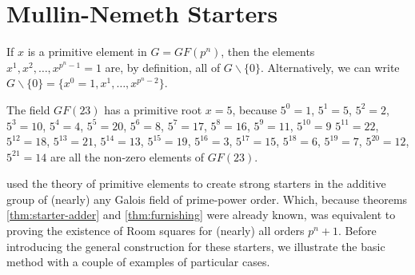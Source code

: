 \section{Mullin-Nemeth Starters}

If $x$ is a primitive element in $G = GF(p^n)$, then the elements
$x^1, x^2, \ldots, x^{p^n - 1} = 1$ are, by definition, all of $G \backslash \{0\}$.
Alternatively, we can write $G \backslash \{0\} = \{x^0 = 1, x^1, \ldots, x^{p^n - 2}\}$.

\begin{example}
The field $GF(23)$ has a primitive root $x = 5$, because
$5^0 = 1$, $5^1 = 5$, $5^2 = 2$, $5^3 = 10$, $5^4 = 4$,
$5^5 = 20$, $5^6 = 8$, $5^7 = 17$, $5^8 = 16$, $5^9 = 11$,
$5^{10} = 9$ $5^{11} = 22$, $5^{12} = 18$, $5^{13} = 21$,
$5^{14}  =13$, $5^{15} = 19$, $5^{16} = 3$, $5^{17} = 15$,
$5^{18} = 6$, $5^{19} = 7$, $5^{20} = 12$, $5^{21} = 14$
are all the non-zero elements of $GF(23)$.
\end{example}

\cite{mullinFurnishingRoomSquares1969}
used the theory of primitive elements to create strong starters in the additive group of (nearly) any Galois field of prime-power order.
Which, because theorems
\ref{thm:starter-adder}
and
\ref{thm:furnishing}
were already known, was equivalent to proving the existence of Room squares for (nearly) all orders $p^n + 1$.
Before introducing the general construction for these starters, we illustrate the basic method with a couple of examples of particular cases.

